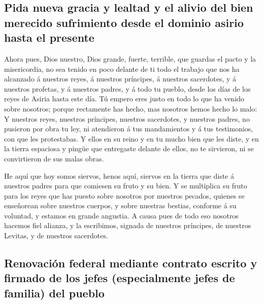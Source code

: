 \hypertarget{pida-nueva-gracia-y-lealtad-y-el-alivio-del-bien-merecido-sufrimiento-desde-el-dominio-asirio-hasta-el-presente}{%
\subsection{Pida nueva gracia y lealtad y el alivio del bien merecido
sufrimiento desde el dominio asirio hasta el
presente}\label{pida-nueva-gracia-y-lealtad-y-el-alivio-del-bien-merecido-sufrimiento-desde-el-dominio-asirio-hasta-el-presente}}

 Ahora pues, Dios nuestro, Dios grande, fuerte, terrible,
que guardas el pacto y la misericordia, no sea tenido en poco delante de
ti todo el trabajo que nos ha alcanzado á nuestros reyes, á nuestros
príncipes, á nuestros sacerdotes, y á nuestros profetas, y á nuestros
padres, y á todo tu pueblo, desde los días de los reyes de Asiria hasta
este día.  Tú empero eres justo en todo lo que ha venido
sobre nosotros; porque rectamente has hecho, mas nosotros hemos hecho lo
malo:  Y nuestros reyes, nuestros príncipes, nuestros
sacerdotes, y nuestros padres, no pusieron por obra tu ley, ni
atendieron á tus mandamientos y á tus testimonios, con que les
protestabas.  Y ellos en su reino y en tu mucho bien que
les diste, y en la tierra espaciosa y pingüe que entregaste delante de
ellos, no te sirvieron, ni se convirtieron de sus malas obras.

 He aquí que hoy somos siervos, henos aquí, siervos en la
tierra que diste á nuestros padres para que comiesen su fruto y su bien.
 Y se multiplica su fruto para los reyes que has puesto
sobre nosotros por nuestros pecados, quienes se enseñorean sobre
nuestros cuerpos, y sobre nuestras bestias, conforme á su voluntad, y
estamos en grande angustia.  A causa pues de todo eso
nosotros hacemos fiel alianza, y la escribimos, signada de nuestros
príncipes, de nuestros Levitas, y de nuestros sacerdotes.

\hypertarget{renovaciuxf3n-federal-mediante-contrato-escrito-y-firmado-de-los-jefes-especialmente-jefes-de-familia-del-pueblo}{%
\subsection{Renovación federal mediante contrato escrito y firmado de
los jefes (especialmente jefes de familia) del
pueblo}\label{renovaciuxf3n-federal-mediante-contrato-escrito-y-firmado-de-los-jefes-especialmente-jefes-de-familia-del-pueblo}}

